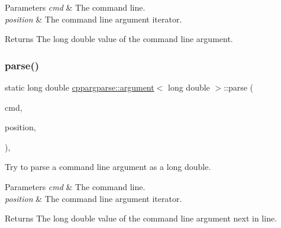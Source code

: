 \begin{DoxyParams}{Parameters}
{\em cmd} & The command line. \\
\hline
{\em position} & The command line argument iterator.\\
\hline
\end{DoxyParams}
\begin{DoxyReturn}{Returns}
The long double value of the command line argument. 
\end{DoxyReturn}
\mbox{\label{structcppargparse_1_1argument_3_01long_01double_01_4_ab14f735177594429fcc952fd6c7caf03}} 
\subsubsection{\texorpdfstring{parse()}{parse()}}
{\footnotesize\ttfamily static long double \hyperlink{structcppargparse_1_1argument}{cppargparse\+::argument}$<$ long double $>$\+::parse (\begin{DoxyParamCaption}\item[{const \hyperlink{types_8h_a80adf2418b7ce9fe616698efa7533ecf}{types\+::\+Command\+Line\+\_\+t} \&}]{cmd,  }\item[{const \hyperlink{types_8h_a43b4f43f8940de1bf09ced6f1b668053}{types\+::\+Command\+Line\+Position\+\_\+t} \&}]{position,  }\item[{const \hyperlink{types_8h_a003c660afe2ee9c6cc39aea966e8926d}{types\+::\+Command\+Line\+Arguments\+\_\+t} \&}]{ }\end{DoxyParamCaption})\hspace{0.3cm}{\ttfamily [inline]}, {\ttfamily [static]}}



Try to parse a command line argument as a long double. 


\begin{DoxyParams}{Parameters}
{\em cmd} & The command line. \\
\hline
{\em position} & The command line argument iterator.\\
\hline
\end{DoxyParams}
\begin{DoxyReturn}{Returns}
The long double value of the command line argument next in line. 
\end{DoxyReturn}
\mbox{\label{structcppargparse_1_1argument_3_01long_01double_01_4_af5083247a7345ef5aa6dac17ab8d8378}} 
